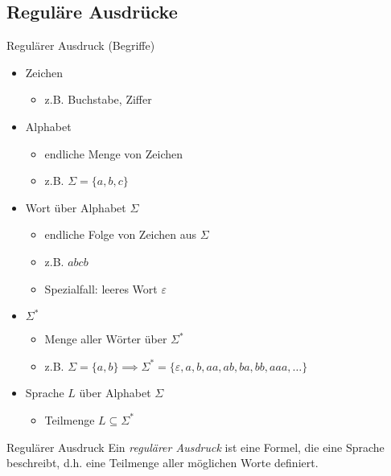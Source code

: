 
\subsection{Reguläre Ausdrücke}

\begin{bonus}{Regulärer Ausdruck (Begriffe)}
    \begin{itemize}
        \item Zeichen
              \begin{itemize}
                  \item z.B. Buchstabe, Ziffer
              \end{itemize}
        \item Alphabet
              \begin{itemize}
                  \item endliche Menge von Zeichen
                  \item z.B. $\Sigma = \{a, b, c\}$
              \end{itemize}
        \item Wort über Alphabet $\Sigma$
              \begin{itemize}
                  \item endliche Folge von Zeichen aus $\Sigma$
                  \item z.B. $abcb$
                  \item Spezialfall: leeres Wort $\varepsilon$
              \end{itemize}
        \item $\Sigma^*$
              \begin{itemize}
                  \item Menge aller Wörter über $\Sigma^*$
                  \item z.B. $\Sigma = \{a, b\} \implies \Sigma^* = \{\varepsilon, a, b, aa, ab, ba, bb, aaa, \ldots\}$
              \end{itemize}
        \item Sprache $L$ über Alphabet $\Sigma$
              \begin{itemize}
                  \item Teilmenge $L \subseteq \Sigma^*$
              \end{itemize}
    \end{itemize}
\end{bonus}

\begin{defi}{Regulärer Ausdruck}
    Ein \emph{regulärer Ausdruck} ist eine Formel, die eine Sprache beschreibt, d.h. eine Teilmenge aller möglichen Worte definiert.
\end{defi}

